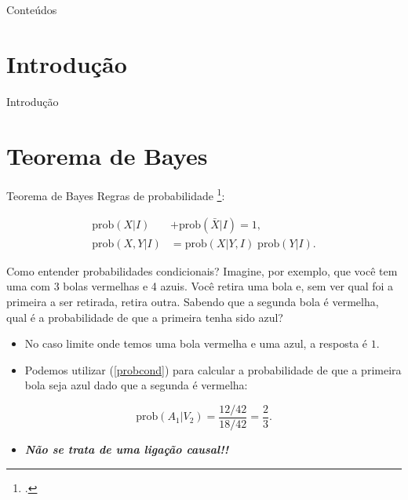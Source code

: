 \documentclass[aspectratio=169,xcolor=dvipsnames]{beamer}
\newcommand{\prob}{\text{prob}}
\begin{document}
\begin{frame}[plain]
  \titlepage
\end{frame}

\begin{frame}[plain]{Conteúdos}
  \tableofcontents
\end{frame}

\section{Introdução}
\begin{frame}{Introdução}

\end{frame}

\section{Teorema de Bayes}
\begin{frame}{Teorema de Bayes}
Regras de probabilidade \footcite{Sivia_2006}:

\begin{align}
  \prob(X | I) &+ \prob(\bar X | I) = 1, \\
  \prob(X,Y | I) &= \prob(X | Y, I) \; \prob(Y | I). \label{probcond}
\end{align}

\end{frame}

\begin{frame}{Como entender probabilidades condicionais?}
  Imagine, por exemplo, que você tem uma com 3 bolas vermelhas e 4 azuis. Você retira uma bola e, sem ver qual foi a primeira a ser retirada, retira outra. Sabendo que a segunda bola é vermelha, qual é a probabilidade de que a primeira tenha sido azul?

  \begin{itemize}
    \item No caso limite onde temos uma bola vermelha e uma azul, a resposta é $1$.
    \item Podemos utilizar (\ref{probcond}) para calcular a probabilidade de que a primeira bola seja azul dado que a segunda é vermelha:
  \end{itemize}

  \begin{equation}
    \prob(A_1 | V_2) = \frac{12/42}{18/42} = \frac{2}{3}.
  \end{equation}

  \begin{itemize}
    \item \textbf{\emph{Não se trata de uma ligação causal!!}}
  \end{itemize}
\end{frame}
\end{document}
